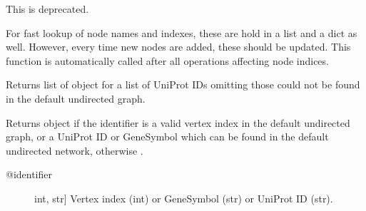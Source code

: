\documentclass[letterpaper,10pt,english]{sphinxmanual}
\begin{document}
\begin{fulllineitems}
\begin{fulllineitems}
\end{fulllineitems}


\begin{fulllineitems}
\label{\detokenize{main:pypath.main.PyPath.update_vindex}}
This is deprecated.

\end{fulllineitems}


\begin{fulllineitems}
\label{\detokenize{main:pypath.main.PyPath.update_vname}}
For fast lookup of node names and indexes, these are
hold in a list and a dict as well. However, every time
new nodes are added, these should be updated. This
function is automatically called after all operations
affecting node indices.

\end{fulllineitems}


\begin{fulllineitems}
\label{\detokenize{main:pypath.main.PyPath.ups}}
Returns list of  object
for a list of UniProt IDs omitting those
could not be found in the default
undirected graph.

\end{fulllineitems}


\begin{fulllineitems}
\label{\detokenize{main:pypath.main.PyPath.v}}
Returns  object if the identifier
is a valid vertex index in the default undirected graph,
or a UniProt ID or GeneSymbol which can be found in the
default undirected network, otherwise .
\begin{description}
\item[{@identifier}] \leavevmode{[}int, str{]}
Vertex index (int) or GeneSymbol (str) or UniProt ID (str).


\end{description}
\end{fulllineitems}
\end{fulllineitems}
\end{document}
